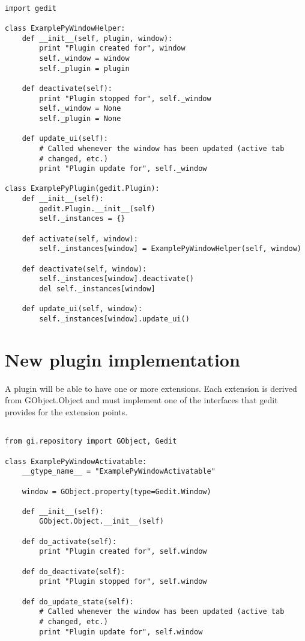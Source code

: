 \begin{lstlisting}[style=python]

import gedit

class ExamplePyWindowHelper:
    def __init__(self, plugin, window):
        print "Plugin created for", window
        self._window = window
        self._plugin = plugin

    def deactivate(self):
        print "Plugin stopped for", self._window
        self._window = None
        self._plugin = None

    def update_ui(self):
        # Called whenever the window has been updated (active tab
        # changed, etc.)
        print "Plugin update for", self._window

class ExamplePyPlugin(gedit.Plugin):
    def __init__(self):
        gedit.Plugin.__init__(self)
        self._instances = {}

    def activate(self, window):
        self._instances[window] = ExamplePyWindowHelper(self, window)

    def deactivate(self, window):
        self._instances[window].deactivate()
        del self._instances[window]

    def update_ui(self, window):
        self._instances[window].update_ui()

\end{lstlisting}

\section{New plugin implementation}

A plugin will be able to have one or more extensions. Each extension is derived from GObject.Object and must implement one of the interfaces that gedit provides for the extension points.

\begin{lstlisting}[style=python]

from gi.repository import GObject, Gedit

class ExamplePyWindowActivatable:
    __gtype_name__ = "ExamplePyWindowActivatable"

    window = GObject.property(type=Gedit.Window)

    def __init__(self):
        GObject.Object.__init__(self)

    def do_activate(self):
        print "Plugin created for", self.window

    def do_deactivate(self):
        print "Plugin stopped for", self.window

    def do_update_state(self):
        # Called whenever the window has been updated (active tab
        # changed, etc.)
        print "Plugin update for", self.window

\end{lstlisting}

